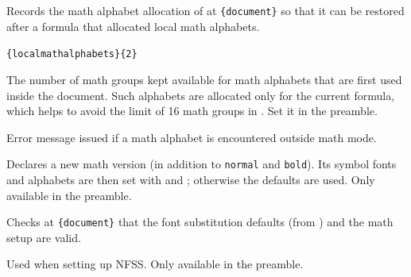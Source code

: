 \documentclass{l3in2edoc}
\begin{document}
\begin{function}[int]
  {
    \freeze@math@version
  }
  \begin{syntax}
     
  \end{syntax}
  Records the math alphabet allocation of  at
  \texttt{\{document\}} so that it can be restored after a
  formula that allocated local math alphabets.
\end{function}



\begin{variable}[user]
  {
    \c@localmathalphabets
  }
  \begin{syntax}
    \texttt{\{localmathalphabets\}\{2\}}
  \end{syntax}
  The number of math groups kept available for math alphabets that
  are first used inside the document. Such alphabets are allocated
  only for the current formula, which helps to avoid the limit of 16
  math groups in \pdfTeX{}. Set it in the preamble.
\end{variable}




\begin{function}[]
  {
    \non@alpherr
  }
  \begin{syntax}
     
  \end{syntax}
  Error message issued if a math alphabet is encountered outside math mode.
\end{function}



\begin{function}[user]
  {
    \DeclareMathVersion
  }
  \begin{syntax}
     
  \end{syntax}
  Declares a new math version (in addition to \texttt{normal} and
  \texttt{bold}). Its symbol fonts and alphabets are then set with
   and ; otherwise the
  defaults are used. Only available in the preamble.
\end{function}



\begin{function}[int]
  {
    \process@table
  }
  Checks at \texttt{\{document\}} that the font substitution
  defaults (from ) and the math setup are valid.

  Used when setting up NFSS. Only available in the preamble.
\end{function}
\end{document}
